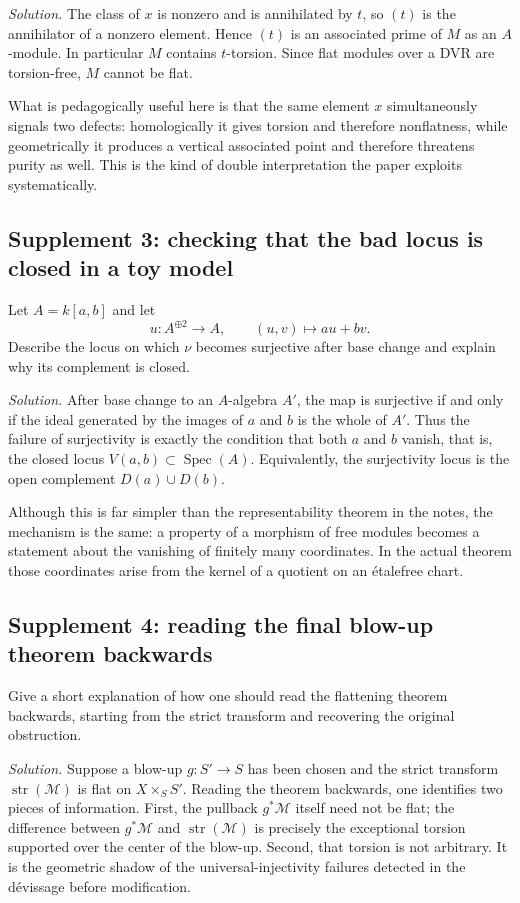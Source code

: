 \documentclass[11pt,oneside]{article}
\newcommand{\M}{\mathcal M}
\newcommand{\Spec}{\operatorname{Spec}}
\newcommand{\etale}{\'etale}
\newcommand{\st}{\operatorname{str}}
\begin{document}
\emph{Solution.}  The class of $x$ is nonzero and is annihilated by $t$, so $(t)$ is the annihilator of a nonzero element.  Hence $(t)$ is an associated prime of $M$ as an $A$-module.  In particular $M$ contains $t$-torsion.  Since flat modules over a DVR are torsion-free, $M$ cannot be flat.

What is pedagogically useful here is that the same element $x$ simultaneously signals two defects: homologically it gives torsion and therefore nonflatness, while geometrically it produces a vertical associated point and therefore threatens purity as well.  This is the kind of double interpretation the paper exploits systematically.

\subsection*{Supplement 3: checking that the bad locus is closed in a toy model}

Let $A=k[a,b]$ and let
\[
u\colon A^{\oplus 2}\longrightarrow A,
\qquad (u,v)\longmapsto au+bv.
\]
Describe the locus on which $\nu$ becomes surjective after base change and explain why its complement is closed.

\emph{Solution.}  After base change to an $A$-algebra $A'$, the map is surjective if and only if the ideal generated by the images of $a$ and $b$ is the whole of $A'$.  Thus the failure of surjectivity is exactly the condition that both $a$ and $b$ vanish, that is, the closed locus $V(a,b)\subset \Spec(A)$.  Equivalently, the surjectivity locus is the open complement $D(a)\cup D(b)$.

Although this is far simpler than the representability theorem in the notes, the mechanism is the same: a property of a morphism of free modules becomes a statement about the vanishing of finitely many coordinates.  In the actual theorem those coordinates arise from the kernel of a quotient on an \etale free chart.

\subsection*{Supplement 4: reading the final blow-up theorem backwards}

Give a short explanation of how one should read the flattening theorem backwards, starting from the strict transform and recovering the original obstruction.

\emph{Solution.}  Suppose a blow-up $g\colon S'\to S$ has been chosen and the strict transform $\st(\M)$ is flat on $X\times_S S'$.  Reading the theorem backwards, one identifies two pieces of information.  First, the pullback $g^*\M$ itself need not be flat; the difference between $g^*\M$ and $\st(\M)$ is precisely the exceptional torsion supported over the center of the blow-up.  Second, that torsion is not arbitrary.  It is the geometric shadow of the universal-injectivity failures detected in the d\'evissage before modification.
\end{document}
